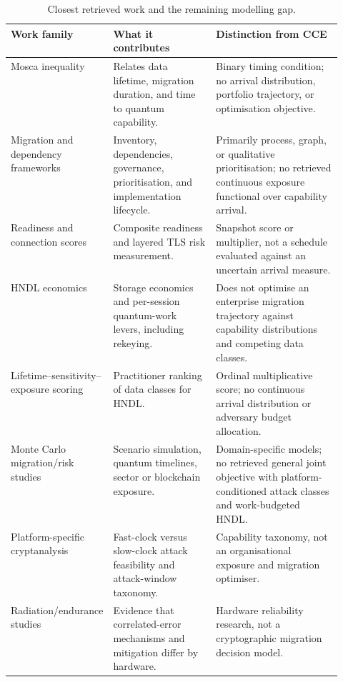 \documentclass[10pt]{article}
\begin{document}
\begin{table}[ht]
\centering
\caption{Closest retrieved work and the remaining modelling gap.}
\label{tab:prior}
\small
\begin{tabularx}{\linewidth}{@{}p{0.23\linewidth}p{0.31\linewidth}X@{}}
\toprule
Work family & What it contributes & Distinction from CCE \\
\midrule
Mosca inequality \cite{mosca2018,etsi} & Relates data lifetime, migration duration, and time to quantum capability. & Binary timing condition; no arrival distribution, portfolio trajectory, or optimisation objective. \\
Migration and dependency frameworks \cite{hasan2024,chammas2026,nccoe,applied2026} & Inventory, dependencies, governance, prioritisation, and implementation lifecycle. & Primarily process, graph, or qualitative prioritisation; no retrieved continuous exposure functional over capability arrival. \\
Readiness and connection scores \cite{cars2026,tlsrisk2026} & Composite readiness and layered TLS risk measurement. & Snapshot score or multiplier, not a schedule evaluated against an uncertain arrival measure. \\
HNDL economics \cite{blanco2026} & Storage economics and per-session quantum-work levers, including rekeying. & Does not optimise an enterprise migration trajectory against capability distributions and competing data classes. \\
Lifetime--sensitivity--exposure scoring \cite{conceptualise2026} & Practitioner ranking of data classes for HNDL. & Ordinal multiplicative score; no continuous arrival distribution or adversary budget allocation. \\
Monte Carlo migration/risk studies \cite{sammo2026,horizon2026} & Scenario simulation, quantum timelines, sector or blockchain exposure. & Domain-specific models; no retrieved general joint objective with platform-conditioned attack classes and work-budgeted HNDL. \\
Platform-specific cryptanalysis \cite{babbush2026} & Fast-clock versus slow-clock attack feasibility and attack-window taxonomy. & Capability taxonomy, not an organisational exposure and migration optimiser. \\
Radiation/endurance studies \cite{mcewen2021,q3de2025,nho2026,pinckney2026} & Evidence that correlated-error mechanisms and mitigation differ by hardware. & Hardware reliability research, not a cryptographic migration decision model. \\
\bottomrule
\end{tabularx}
\end{table}
\end{document}
